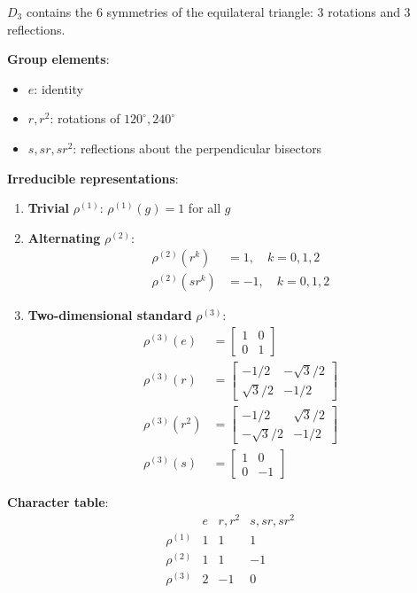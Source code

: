 \begin{example}\label{ex:grupo_d3_detallado}
$D_3$ contains the 6 symmetries of the equilateral triangle: 3 rotations and 3 reflections.

\textbf{Group elements}:
\begin{itemize}
    \item $e$: identity
    \item $r, r^2$: rotations of $120^\circ, 240^\circ$
    \item $s, sr, sr^2$: reflections about the perpendicular bisectors
\end{itemize}

\textbf{Irreducible representations}:
\begin{enumerate}
    \item \textbf{Trivial} $\rho^{(1)}$: $\rho^{(1)}(g) = 1$ for all $g$
    \item \textbf{Alternating} $\rho^{(2)}$:
    \begin{align}
    \rho^{(2)}(r^k) &= 1, \quad k = 0,1,2 \\
    \rho^{(2)}(sr^k) &= -1, \quad k = 0,1,2
    \end{align}
    \item \textbf{Two-dimensional standard} $\rho^{(3)}$:
    \begin{align}
    \rho^{(3)}(e) &= \begin{bmatrix} 1 & 0 \\ 0 & 1 \end{bmatrix} \\
    \rho^{(3)}(r) &= \begin{bmatrix} -1/2 & -\sqrt{3}/2 \\ \sqrt{3}/2 & -1/2 \end{bmatrix} \\
    \rho^{(3)}(r^2) &= \begin{bmatrix} -1/2 & \sqrt{3}/2 \\ -\sqrt{3}/2 & -1/2 \end{bmatrix} \\
    \rho^{(3)}(s) &= \begin{bmatrix} 1 & 0 \\ 0 & -1 \end{bmatrix}
    \end{align}
\end{enumerate}

\textbf{Character table}:
\begin{equation}
\begin{array}{c|ccc}
 & e & r, r^2 & s, sr, sr^2 \\
\hline
\rho^{(1)} & 1 & 1 & 1 \\
\rho^{(2)} & 1 & 1 & -1 \\
\rho^{(3)} & 2 & -1 & 0
\end{array}
\end{equation}


\end{example}
